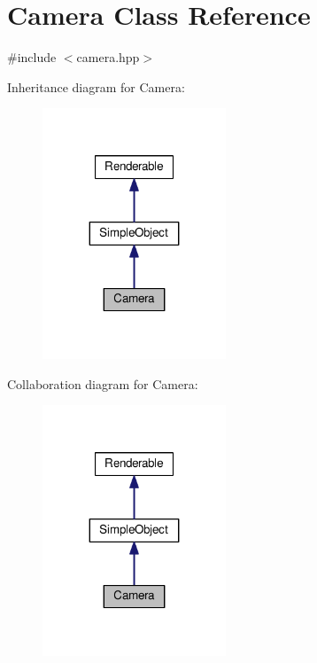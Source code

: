 \hypertarget{class_camera}{}\section{Camera Class Reference}
\label{class_camera}


{\ttfamily \#include $<$camera.\+hpp$>$}



Inheritance diagram for Camera\+:\nopagebreak
\begin{figure}[H]
\begin{center}
\leavevmode
\includegraphics[width=155pt]{class_camera__inherit__graph}
\end{center}
\end{figure}


Collaboration diagram for Camera\+:\nopagebreak
\begin{figure}[H]
\begin{center}
\leavevmode
\includegraphics[width=155pt]{class_camera__coll__graph}
\end{center}
\end{figure}
